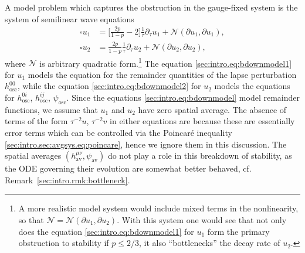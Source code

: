 \documentclass{article}
\newcommand{\osc}{\mathrm{osc}}
\newcommand{\av}{\mathrm{av}}
\newcommand{\mc}{\mathcal}
\newcommand{\pa}{\partial}
\begin{document}
A model problem which captures the obstruction in the gauge-fixed system is the system of semilinear wave equations
\begin{subequations}\label{sec:intro.eq:bdownmodel}
    \begin{align}
        \square u_1 &= \Big[\frac{2p}{1-p}-2\Big]\frac{1}{\tau}\pa_\tau u_1 + \mc{N}(\pa u_1,\pa u_1),\label{sec:intro.eq:bdownmodel1}\\
        \square u_2 &= \frac{2p}{1-p}\frac{1}{\tau}\pa_\tau u_2 + \mc{N}(\pa u_2,\pa u_2),\label{sec:intro.eq:bdownmodel2}
    \end{align}
\end{subequations}
where $\mc{N}$ is arbitrary quadratic form.\footnote{A more realistic model system would include mixed terms in the nonlinearity, so that $\mc{N} = \mc{N}(\pa u_1,\pa u_2)$. With this system one would see that not only does the equation \eqref{sec:intro.eq:bdownmodel1} for $u_1$ form the primary obstruction to stability if $p \leq 2/3$, it also ``bottlenecks'' the decay rate of $u_2$.} The equation \eqref{sec:intro.eq:bdownmodel1} for $u_1$ models the equation for the remainder quantities of the lapse perturbation $h_{\osc}^{00}$, while the equation \eqref{sec:intro.eq:bdownmodel2} for $u_2$ models the equations for $h_{\osc}^{0i}$, $h_{\osc}^{ij}$, $\psi_{\osc}$. Since the equations \eqref{sec:intro.eq:bdownmodel} model remainder functions, we assume that $u_1$ and $u_2$ have zero spatial average. The absence of terms of the form $\tau^{-2}u$, $\tau^{-2}v$ in either equations are because these are essentially error terms which can be controlled via the Poincar\'e inequality \eqref{sec:intro.sec:avgsys.eq:poincare}, hence we ignore them in this discussion. The spatial averages $(h_{\av}^{\mu\nu},\psi_{\av})$ do not play a role in this breakdown of stability, as the ODE governing their evolution are somewhat better behaved, cf. Remark~\ref{sec:intro.rmk:bottleneck}. 
\end{document}
